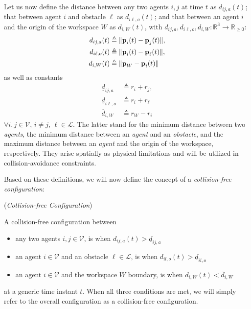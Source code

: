 Let us now define the distance between any two agents $i,j$ at time $t$ as
$d_{ij,a}(t)$; that between agent $i$ and obstacle $\ell$ as $d_{i\ell,o}(t)$;
and that between an agent $i$ and the origin of the workspace $W$ as
$d_{i,W}(t)$, with $d_{ij,a}, d_{i\ell,o}, d_{i,W} : \mathbb{R}^3 \to \mathbb{R}_{\geq 0}$:
\begin{subequations}
	\begin{align}
    d_{ij,a}(t) &\triangleq \| \bm{\mathbf{p}}_i(t) - \bm{\mathbf{p}}_j(t) \|, \\
    d_{i\ell,o}(t) &\triangleq \| \bm{\mathbf{p}}_i(t) - \bm{\mathbf{p}}_\ell(t) \|, \\
    d_{i,W}(t) &\triangleq \| \bm{\mathbf{p}}_W - \bm{\mathbf{p}}_i(t) \|
	\end{align}
\end{subequations}
as well as constants
\begin{subequations}
	\begin{align}
    \underline{d}_{ij, a} &\triangleq r_{i} + r_{j}, \\
    \underline{d}_{i\ell, o} &\triangleq r_{i} + r_{\ell} \\
    \overline{d}_{i,W} &\triangleq r_W - r_i
	\end{align}
\end{subequations}
$\forall i, j \in \mathcal{V}$, $i \neq j$, $\ell \in \mathcal{L}$.
The latter stand for the minimum distance between two \textit{agents}, the
minimum distance between an \textit{agent} and an \textit{obstacle},
and the maximum distance between an \textit{agent} and the origin of the
workspace, respectively. They arise spatially as physical limitations and will
be utilized in collision-avoidance constraints.

Based on these definitions, we will now define the concept of a
\textit{collision-free configuration}:
\begin{bw_box}
\begin{definition} (\textit{Collision-free Configuration})

  A collision-free configuration between
  \begin{itemize}
    \item any two agents $i,j \in \mathcal{V}$, is when $d_{ij,a}(t) > \underline{d}_{ij,a}$
    \item an agent $i \in \mathcal{V}$ and an obstacle $\ell \in \mathcal{L}$,
     is when $d_{il,o}(t) > \underline{d}_{il,o}$
    \item an agent $i \in \mathcal{V}$ and the workspace $W$ boundary,
     is when $d_{i,W}(t) < \overline{d}_{i,W}$
  \end{itemize}
  at a generic time instant $t$. When all three conditions are met, we will
  simply refer to the overall configuration as a collision-free configuration.
\end{definition}
\end{bw_box}
